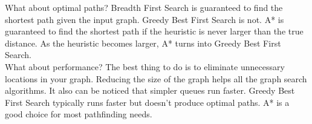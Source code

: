 \documentclass[a4paper]{article}
\begin{document}
\noindent What about optimal paths? Breadth First Search is guaranteed to find the shortest path given the input graph. Greedy Best First Search is not. A* is guaranteed to find the shortest path if the heuristic is never larger than the true distance. As the heuristic becomes larger, A* turns into Greedy Best First Search.\\

\noindent What about performance? The best thing to do is to eliminate unnecessary locations in your graph. Reducing the size of the graph helps all the graph search algorithms. It also can be noticed that simpler queues run faster. Greedy Best First Search typically runs faster but doesn’t produce optimal paths. A* is a good choice for most pathfinding needs.






\end{document}
